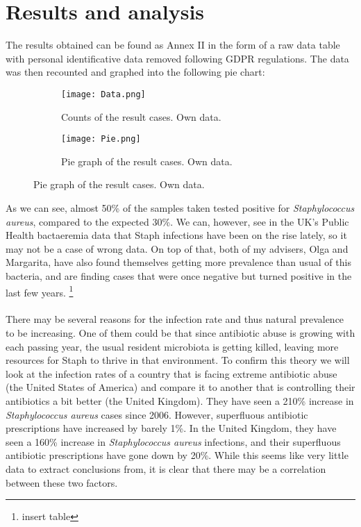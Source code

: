 \section{Results and analysis}
The results obtained can be found as Annex II in the form of a raw data table with personal identificative data removed following GDPR regulations. The data was then recounted and graphed into the following pie chart:
\begin{center}\begin{figure}[H]\centering\begin{subfigure}[b]{0.4\linewidth}\texttt{[image: Data.png]}\caption{Counts of the result cases. Own data.}\end{subfigure}\begin{subfigure}[b]{0.4\linewidth}\texttt{[image: Pie.png]}\caption{Pie graph of the result cases. Own data.}\end{subfigure}\end{figure}\end{center}
As we can see, almost 50\% of the samples taken tested positive for \emph{Staphylococcus aureus}, compared to the expected 30\%\cite{StaphylococcusAureusHealthcare2020}. We can, however, see in the UK's Public Health bactaeremia data that Staph infections have been on the rise lately, so it may not be a case of wrong data\cite{englandMSSABacteraemiaAnnual2021}. On top of that, both of my advisers, Olga and Margarita, have also found themselves getting more prevalence than usual of this bacteria, and are finding cases that were once negative but turned positive in the last few years. \footnote{insert table}
\paragraph{}There may be several reasons for the infection rate and thus natural prevalence to be increasing. One of them could be that since antibiotic abuse is growing with each passing year, the usual resident microbiota is getting killed, leaving more resources for Staph to thrive in that environment. To confirm this theory we will look at the infection rates of a country that is facing extreme antibiotic abuse (the United States of America) and compare it to another that is controlling their antibiotics a bit better (the United Kingdom). They have seen a 210\% increase in \emph{Staphylococcus aureus} cases since 2006. However, superfluous antibiotic prescriptions have increased by barely 1\%\cite{baggsEstimatingNationalTrends2016}. In the United Kingdom, they have seen a 160\% increase in \emph{Staphylococcus aureus} infections\cite{englandMSSABacteraemiaAnnual2021}, and their superfluous antibiotic prescriptions have gone down by 20\%. While this seems like very little data to extract conclusions from, it is clear that there may be a correlation between these two factors.
